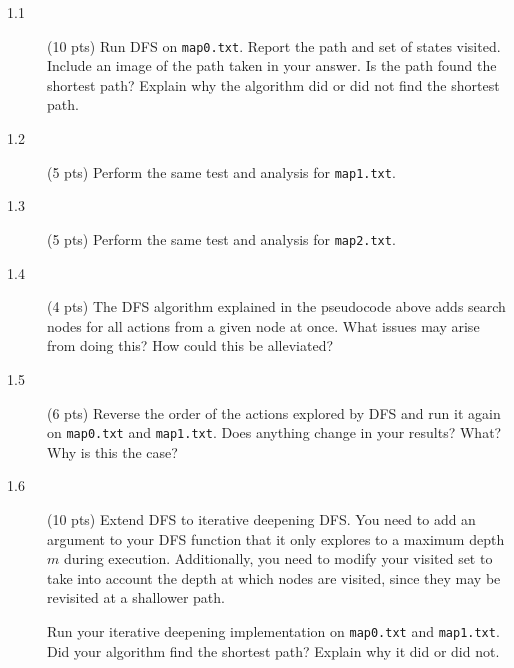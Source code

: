 \documentclass[11pt]{hermans-hw}
\begin{document}
\begin{description}
\item[1.1] (10 pts) Run DFS on \texttt{map0.txt}. Report the path and set of states visited. Include an image of the path taken in your answer.
Is the path found the shortest path? Explain why the algorithm did or did not find the shortest path.
\item[1.2] (5 pts) Perform the same test and analysis for \texttt{map1.txt}.
\item[1.3] (5 pts) Perform the same test and analysis for \texttt{map2.txt}.
\item[1.4] (4 pts) The DFS algorithm explained in the pseudocode above adds search nodes for all actions from a given node at once. What issues may arise from doing this? How could this be alleviated?
\item[1.5] (6 pts) Reverse the order of the actions explored by DFS and run it again on  \texttt{map0.txt} and \texttt{map1.txt}. Does anything change in your results? What? Why is this the case?
\item[1.6] (10 pts) Extend DFS to iterative deepening DFS. You need to add an argument to your DFS function that it only explores to a maximum depth \(m\) during execution. Additionally, you need to modify your visited set to take into account the depth at which nodes are visited, since they may be revisited at a shallower path.

Run your iterative deepening implementation on \texttt{map0.txt} and \texttt{map1.txt}. Did your algorithm find the shortest path? Explain why it did or did not. 

\end{description}
\end{document}

